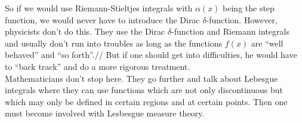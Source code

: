 So if we would use Riemann-Stieltjes integrals with $\alpha(x)$ being the step function, we would never have
to introduce the Dirac $\delta$-function. However, physicists don't do this. They use the Dirac $\delta$-function and Riemann integrals and usually don't run into troubles as 
long as the functions $f(x)$ are ``well behaved'' and ``so forth''.//
But if one should get into difficulties, he would have to ``back track'' and do a more rigorous treatment. \\
Mathematicians don't stop here. They go further and talk about Lebesgue integrals where they can use functions which are not only discontinuous but which 
may only be defined in certain regions and at certain points. Then one must become involved with Lesbesgue measure theory.